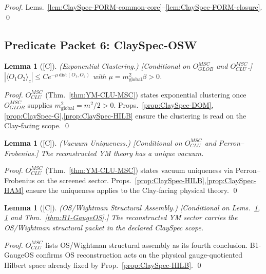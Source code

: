 \documentclass[12pt,oneside]{amsbook}
\theoremstyle{plain}
\newtheorem{lemma}[theorem]{Lemma}
\theoremstyle{definition}
\theoremstyle{remark}
\newcommand{\status}[1]{\textup{[#1]}}
\begin{document}
\begin{proof}
Lems.~\ref{lem:ClaySpec-FORM-common-core}--\ref{lem:ClaySpec-FORM-closure}.
\qed
\end{proof}

\subsection{Predicate Packet 6: ClaySpec-OSW}

\begin{lemma}[\status{C}]\label{lem:ClaySpec-OSW-clustering}
\textup{(Exponential Clustering.)}
\textup{[Conditional on $O_{GLOB}^{MSC}$ and $O_{CLU}^{MSC}$.]}
$|\langle O_1 O_2\rangle_c|\le Ce^{-\mu\,\mathrm{dist}(O_1,O_2)}$
with $\mu=m^2_{\mathrm{global}}\beta>0$.
\end{lemma}

\begin{proof}
$O_{CLU}^{MSC}$ (Thm.~\ref{thm:YM-CLU-MSC}) states exponential
clustering once $O_{GLOB}^{MSC}$ supplies
$m^2_{\mathrm{global}}=m^2/2>0$.
Props.~\ref{prop:ClaySpec-DOM},\ref{prop:ClaySpec-G},\ref{prop:ClaySpec-HILB}
ensure the clustering is read on the Clay-facing scope.
\qed
\end{proof}

\begin{lemma}[\status{C}]\label{lem:ClaySpec-OSW-vacuum}
\textup{(Vacuum Uniqueness.)}
\textup{[Conditional on $O_{CLU}^{MSC}$ and Perron--Frobenius.]}
The reconstructed YM theory has a unique vacuum.
\end{lemma}

\begin{proof}
$O_{CLU}^{MSC}$ (Thm.~\ref{thm:YM-CLU-MSC}) states vacuum uniqueness
via Perron--Frobenius on the screened sector.
Props.~\ref{prop:ClaySpec-HILB},\ref{prop:ClaySpec-HAM} ensure the
uniqueness applies to the Clay-facing physical theory.
\qed
\end{proof}

\begin{lemma}[\status{C}]\label{lem:ClaySpec-OSW-assembly}
\textup{(OS/Wightman Structural Assembly.)}
\textup{[Conditional on Lems.~\ref{lem:ClaySpec-OSW-clustering},
\ref{lem:ClaySpec-OSW-vacuum} and Thm.~\ref{thm:B1-GaugeOS}.]}
The reconstructed YM sector carries the OS/Wightman structural packet
in the declared ClaySpec scope.
\end{lemma}

\begin{proof}
$O_{CLU}^{MSC}$ lists OS/Wightman structural assembly as its fourth
conclusion. B1-GaugeOS confirms OS reconstruction acts on the
physical gauge-quotiented Hilbert space already fixed by
Prop.~\ref{prop:ClaySpec-HILB}.
\qed
\end{proof}
\end{document}
